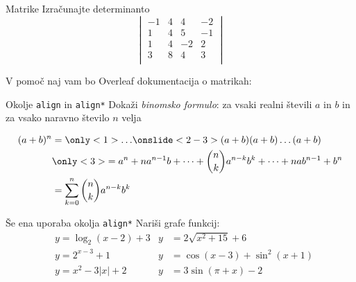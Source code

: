 \begin{frame}{Matrike}
	Izračunajte determinanto
	\[
	\begin{vmatrix}
		-1 & 4 & 4 & -2 \\
		1 & 4 & 5 & -1 \\
		1 & 4 & -2 & 2 \\
		3 & 8 & 4 & 3 \\
	\end{vmatrix}
	\]

	V pomoč naj vam bo Overleaf dokumentacija o matrikah:
	
	\href{https://www.overleaf.com/learn/latex/Matrices}{}
\end{frame}

\begin{frame}{Okolje \texttt{align} in \texttt{align*}}
	Dokaži \emph{binomsko formulo}: za vsaki realni števili $a$ in $b$ in za vsako naravno število $n$ velja
	
	\begin{align*}
		(a+b)^n & =\only<1>{\ldots }
		\onslide<2-3>{(a+b) (a+b) \dots (a+b)}\\
		&\only<3>{= a^n + n a^{n-1} b + \dots + \binom{n}{k} a^{n-k} b^k + \dots + n a b^{n-1} + b^n}\\
		& = \sum_{k=0}^n \binom{n}{k} a^{n-k} b^k
	\end{align*}
	
\end{frame}

\begin{frame}{Še ena uporaba okolja \texttt{align*}}
	Nariši grafe funkcij:
	\begin{align*}
		& y = \log_2(x-2) + 3     & y & = 2 \sqrt{x^2+15} + 6 \\
		& y = 2^{x-3} + 1         & y & = \cos(x-3) + \sin^2(x+1)\\
		& y = x^2 - 3|x| + 2      & y & = 3 \sin(\pi+x) - 2 \\
	\end{align*}

\end{frame}

